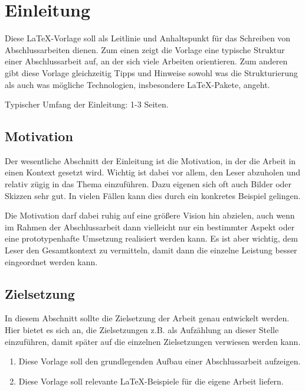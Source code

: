 \chapter{Einleitung}

Diese \LaTeX-Vorlage soll als Leitlinie und Anhaltspunkt für das Schreiben von Abschlussarbeiten dienen. Zum einen zeigt die Vorlage eine typische Struktur einer Abschlussarbeit auf, an der sich viele Arbeiten orientieren. Zum anderen gibt diese Vorlage gleichzeitig Tipps und Hinweise sowohl was die Strukturierung als auch was mögliche Technologien, insbesondere \LaTeX-Pakete, angeht.

Typischer Umfang der Einleitung: 1-3 Seiten.

\section{Motivation}

Der wesentliche Abschnitt der Einleitung ist die Motivation, in der die Arbeit in einen Kontext gesetzt wird. Wichtig ist dabei vor allem, den Leser abzuholen und relativ zügig in das Thema einzuführen. Dazu eigenen sich oft auch Bilder oder Skizzen sehr gut. In vielen Fällen kann dies durch ein konkretes Beispiel gelingen.

Die Motivation darf dabei ruhig auf eine größere Vision hin abzielen, auch wenn im Rahmen der Abschlussarbeit dann vielleicht nur ein bestimmter Aspekt oder eine prototypenhafte Umsetzung realisiert werden kann. Es ist aber wichtig, dem Leser den Gesamtkontext zu vermitteln, damit dann die einzelne Leistung besser eingeordnet werden kann.

\section{Zielsetzung}

In diesem Abschnitt sollte die Zielsetzung der Arbeit genau entwickelt werden. Hier bietet es sich an, die Zielsetzungen z.B. als Aufzählung an dieser Stelle einzuführen, damit später auf die einzelnen Zielsetzungen verwiesen werden kann.

\begin{enumerate}[labelsep=1ex]
    \renewcommand{\labelenumi}{\textbf{Z\theenumi.}}
    \item Diese Vorlage soll den grundlegenden Aufbau einer Abschlussarbeit aufzeigen.
    \item Diese Vorlage soll relevante \LaTeX-Beispiele für die eigene Arbeit liefern.
\end{enumerate}

